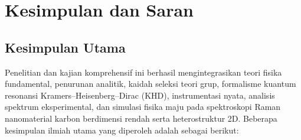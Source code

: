 \section{Kesimpulan dan Saran}
\label{sec:kesimpulan}

\subsection{Kesimpulan Utama}
Penelitian dan kajian komprehensif ini berhasil mengintegrasikan teori fisika fundamental, penurunan analitik, kaidah seleksi teori grup, formalisme kuantum resonansi Kramers--Heisenberg--Dirac (KHD), instrumentasi nyata, analisis spektrum eksperimental, dan simulasi fisika maju pada spektroskopi Raman nanomaterial karbon berdimensi rendah serta heterostruktur 2D. Beberapa kesimpulan ilmiah utama yang diperoleh adalah sebagai berikut:

